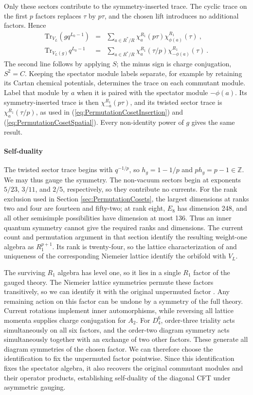 \documentclass[12pt]{article}
\numberwithin{equation}{section}
\newcommand{\bea}{\begin{eqnarray}}
\newcommand{\eea}{\end{eqnarray}}
\def\no{\nonumber}
\def\ZZ{\mathbb{Z}}
\newcommand{\Tr}{\mathrm{Tr}}
\theoremstyle{remark}
\begin{document}
Only these sectors contribute to the symmetry-inserted trace. The cyclic trace on the first $p$ factors replaces $\tau$ by $p\tau$, and the chosen lift introduces no additional factors. Hence
\bea
\Tr_{V_L}\!\left(gq^{L_0-1}\right)&=&\sum_{a\in R^*/R}\chi^{R_1}_a(p\tau)\chi^{R_1}_{\phi(a)}(\tau)~,\no\\
\Tr_{V_L(g)}q^{L_0-1}&=&\sum_{a\in R^*/R}\chi^{R_1}_a(\tau/p)\chi^{R_1}_{-\phi(a)}(\tau)~.
\eea
The second line follows by applying $S$; the minus sign is charge conjugation, $S^2=C$. Keeping the spectator module labels separate, for example by retaining its Cartan chemical potentials, determines the trace on each commutant module. Label that module by $a$ when it is paired with the spectator module $-\phi(a)$. Its symmetry-inserted trace is then $\chi^{R_1}_{-a}(p\tau)$, and its  twisted sector trace is $\chi^{R_1}_a(\tau/p)$, as used in (\ref{eq:PermutationCosetInsertion}) and (\ref{eq:PermutationCosetSpatial}). Every non-identity power of $g$ gives the same result.

\paragraph{Self-duality}
The twisted sector trace begins with $q^{-1/p}$, so $h_g=1-1/p$ and $p h_g=p-1\in\ZZ$. We may thus gauge the symmetry. The non-vacuum sectors begin at exponents $5/23$, $3/11$, and $2/5$, respectively, so they contribute no currents. For the rank exclusion used in Section \ref{sec:PermutationCosets}, the largest dimensions at ranks two and four are fourteen and fifty-two; at rank eight, $E_8$ has dimension 248, and all other semisimple possibilities have dimension at most 136. Thus an inner quantum symmetry cannot give the required ranks and dimensions. The current count and permutation argument in that section identify the resulting weight-one algebra as $R_1^{p+1}$. Its rank is twenty-four, so the lattice characterization of \cite{Dong:2002fs} and uniqueness of the corresponding Niemeier lattice identify the orbifold with $V_L$.

The surviving $R_1$ algebra has level one, so it lies in a single $R_1$ factor of the gauged theory. The Niemeier lattice symmetries permute these factors transitively, so we can identify it with the original unpermuted factor \cite{Conway:1999dov}. Any remaining action on this factor can be undone by a symmetry of the full theory. Current rotations implement inner automorphisms, while reversing all lattice momenta supplies charge conjugation for $A_2$. For $D_4^6$, order-three triality acts simultaneously on all six factors, and the order-two diagram symmetry acts simultaneously together with an exchange of two other factors. These generate all diagram symmetries of the chosen factor. We can therefore choose the identification to fix the unpermuted factor pointwise.
Since this identification fixes the spectator algebra, it also recovers the original commutant modules and their operator products, establishing self-duality of the diagonal CFT under asymmetric gauging.
\end{document}
